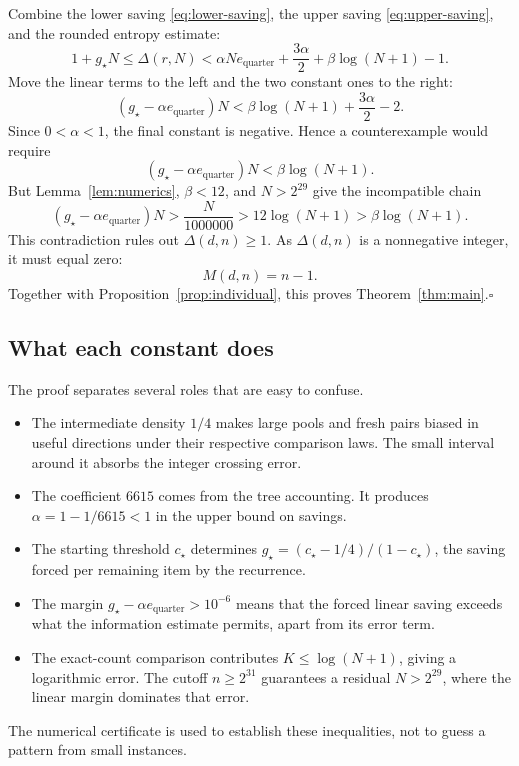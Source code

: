 \documentclass[11pt]{article}
\theoremstyle{definition}
\theoremstyle{remark}
\newcommand{\cstar}{c_\star}
\newcommand{\er}{e_{\mathrm{quarter}}}
\numberwithin{equation}{section}
\begin{document}
Combine the lower saving \eqref{eq:lower-saving}, the upper saving
\eqref{eq:upper-saving}, and the rounded entropy estimate:
\[
 1+g_\star N
 \le\Delta(r,N)
 <\alpha N\er+\frac{3\alpha}{2}
   +\beta\log(N+1)-1.
\]
Move the linear terms to the left and the two constant ones to
the right:
\[
 (g_\star-\alpha\er)N
 <\beta\log(N+1)+\frac{3\alpha}{2}-2.
\]
Since \(0<\alpha<1\), the final constant is negative. Hence a
counterexample would require
\begin{equation}\label{eq:contradiction}
 (g_\star-\alpha\er)N<\beta\log(N+1).
\end{equation}
But Lemma~\ref{lem:numerics}, \(\beta<12\), and
\(N>2^{29}\) give the incompatible chain
\[
 (g_\star-\alpha\er)N
 >\frac N{1000000}
 >12\log(N+1)
 >\beta\log(N+1).
\]
This contradiction rules out \(\Delta(d,n)\ge1\).
As \(\Delta(d,n)\) is a nonnegative integer, it must equal zero:
\[
 M(d,n)=n-1.
\]
Together with Proposition~\ref{prop:individual}, this proves
Theorem~\ref{thm:main}.\quad\hfill\(\square\)

\subsection{What each constant does}

The proof separates several roles that are easy to confuse.
\begin{itemize}
\item The intermediate density \(1/4\) makes large pools and fresh
pairs biased in useful directions under their respective comparison
laws. The small interval around it absorbs the integer crossing error.
\item The coefficient \(6615\) comes from the tree accounting. It
produces \(\alpha=1-1/6615<1\) in the upper bound on savings.
\item The starting threshold \(\cstar\) determines
\(g_\star=(\cstar-1/4)/(1-\cstar)\), the saving forced per remaining
item by the recurrence.
\item The margin \(g_\star-\alpha\er>10^{-6}\) means that the forced
linear saving exceeds what the information estimate permits, apart
from its error term.
\item The exact-count comparison contributes \(K\le\log(N+1)\),
giving a logarithmic error. The cutoff \(n\ge2^{31}\) guarantees a
residual \(N>2^{29}\), where the linear margin dominates that error.
\end{itemize}
The numerical certificate is used to establish these inequalities,
not to guess a pattern from small instances.
\end{document}
